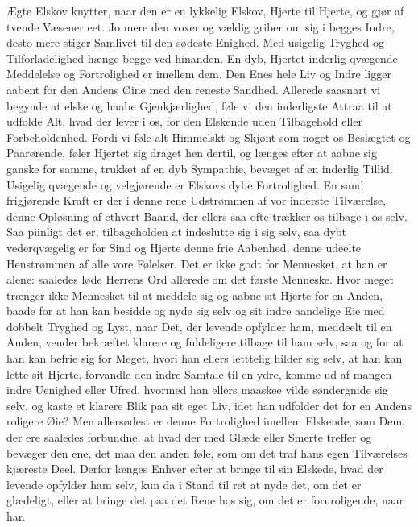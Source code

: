 \documentclass[12pt,a4paper]{book}
\newcommand{\apage}[1]{\marginnote{\footnotesize\textit{[#1]}}}
\begin{document}
Ægte Elskov knytter, naar den er en lykkelig Elskov, Hjerte til Hjerte,
og gjør af tvende Væsener eet. Jo mere den voxer og vældig griber om
sig i begges Indre, desto mere stiger Samlivet til den sødeste Enighed.
Med usigelig Tryghed og Tilforladelighed hænge begge ved hinanden. En
dyb, Hjertet inderlig qvægende Meddelelse og Fortrolighed er imellem
dem. Den Enes hele Liv og Indre ligger aabent for den Andens Øine med
den reneste Sandhed. Allerede saasnart vi begynde at elske og haabe
Gjenkjærlighed, føle vi den inderligste Attraa til at udfolde Alt, hvad
der lever i os, for den Elskende uden Tilbagehold eller Forbeholdenhed.
Fordi vi føle alt Himmelskt og Skjønt som noget os Beslægtet og
Paarørende, føler Hjertet sig draget hen dertil, og længes efter at
aabne sig ganske for samme, trukket af en dyb Sympathie, bevæget af en
inderlig Tillid. Usigelig qvægende og velgjørende er Elskovs dybe
Fortrolighed. En sand frigjørende Kraft er der i denne rene Udstrømmen
af vor inderste Tilværelse, denne Opløsning af ethvert Baand, der ellers
saa ofte trækker os tilbage i os selv. Saa piinligt det er,
tilbageholden at indeslutte sig i sig selv, saa dybt vederqvægelig er
for Sind og Hjerte denne frie Aabenhed, denne udeelte Henstrømmen af
alle vore Følelser. Det er ikke godt for Mennesket, at han er alene:
saaledes løde Herrens Ord allerede om det første \apage{33} Menneske.
Hvor meget trænger ikke Mennesket til at meddele sig og aabne sit
Hjerte for en Anden, baade for at han kan besidde og nyde sig selv og
sit indre aandelige Eie med dobbelt Tryghed og Lyst, naar Det, der
levende opfylder ham, meddeelt til en Anden, vender bekræftet klarere
og fuldeligere tilbage til ham selv, saa og for at han kan befrie sig
for Meget, hvori han ellers letttelig hilder sig selv, at han kan lette
sit Hjerte, forvandle den indre Samtale til en ydre, komme ud af mangen
indre Uenighed eller Ufred, hvormed han ellers maaskee vilde søndergnide
sig selv, og kaste et klarere Blik paa sit eget Liv, idet han udfolder
det for en Andens roligere Øie? Men allersødest er denne Fortrolighed
imellem Elskende, som Dem, der ere saaledes forbundne, at hvad der med
Glæde eller Smerte treffer og bevæger den ene, det maa den anden føle,
som om det traf hans egen Tilværelses kjæreste Deel. Derfor længes
Enhver efter at bringe til sin Elskede, hvad der levende opfylder ham
selv, kun da i Stand til ret at nyde det, om det er glædeligt, eller at
bringe det paa det Rene hos sig, om det er foruroligende, naar han
\end{document}
